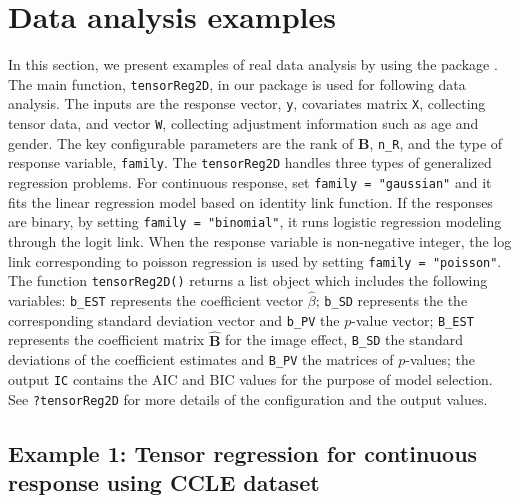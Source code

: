 \hypertarget{data-analysis-examples}{%
\section{Data analysis examples}\label{data-analysis-examples}}

In this section, we present examples of real data analysis by using the
package . The main function, \texttt{tensorReg2D},
in our  package is used for following data
analysis. The inputs are the response vector, \texttt{y}, covariates
matrix \texttt{X}, collecting tensor data, and vector \texttt{W},
collecting adjustment information such as age and gender. The key
configurable parameters are the rank of \(\mathbf{B}\), \texttt{n\_R},
and the type of response variable, \texttt{family}. The
\texttt{tensorReg2D} handles three types of generalized regression
problems. For continuous response, set \texttt{family\ =\ "gaussian"}
and it fits the linear regression model based on identity link function.
If the responses are binary, by setting \texttt{family\ =\ "binomial"},
it runs logistic regression modeling through the logit link. When the
response variable is non-negative integer, the log link corresponding to
poisson regression is used by setting \texttt{family\ =\ "poisson"}.\\
The function \texttt{tensorReg2D()} returns a list object which includes
the following variables: \texttt{b\_EST} represents the coefficient
vector \(\hat{\beta}\); \texttt{b\_SD} represents the the corresponding
standard deviation vector and \texttt{b\_PV} the \(p\)-value vector;
\texttt{B\_EST} represents the coefficient matrix \(\hat{\mathbf{B}}\)
for the image effect, \texttt{B\_SD} the standard deviations of the
coefficient estimates and \texttt{B\_PV} the matrices of \(p\)-values;
the output \texttt{IC} contains the AIC and BIC values for the purpose
of model selection.\\
See \texttt{?tensorReg2D} for more details of the configuration and the
output values.

\hypertarget{example-1-tensor-regression-for-continuous-response-using-ccle-dataset}{%
\subsection{Example 1: Tensor regression for continuous response using
CCLE
dataset}\label{example-1-tensor-regression-for-continuous-response-using-ccle-dataset}}

